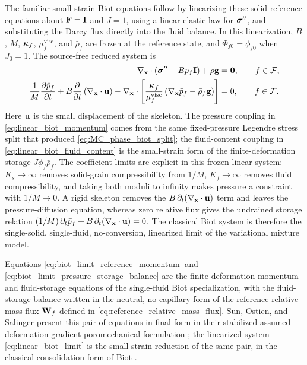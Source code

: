 %
The familiar small-strain Biot equations follow by linearizing these
solid-reference equations about \(\mathbf{F}=\mathbf{I}\) and \(J=1\), using a linear
elastic law for \(\boldsymbol{\sigma}^{\prime\prime}\), and substituting the Darcy flux
directly into the fluid balance.  In this linearization,
\(B\), \(M\), \(\boldsymbol{\kappa}_f\), \(\mu_f^{\mathrm{visc}}\), and \(\bar\rho_f\) are frozen at
the reference state, and \(\Phi_{f0}=\phi_{f0}\) when \(J_0=1\).  The
source-free reduced system is
%
\begin{subequations}
	\label{eq:linear_biot_limit}
	\begin{align}
		\nabla_{\mathbf{x}}\cdot
		\left(
		\boldsymbol{\sigma}^{\prime\prime}
		-B\bar p_f\mathbf{I}
		\right)
		+\rho\mathbf{g}
		 & =\mathbf{0},
		\qquad
		f\in\mathcal{F},
		\label{eq:linear_biot_momentum} \\
		\frac{1}{M}\frac{\partial \bar p_f}{\partial t}
		+B\frac{\partial}{\partial t}
		\left(\nabla_{\mathbf{x}}\cdot\mathbf{u}\right)
		-\nabla_{\mathbf{x}}\cdot
		\left[
			\frac{\boldsymbol{\kappa}_f}{\mu_f^{\mathrm{visc}}}
			\left(\nabla_{\mathbf{x}}\bar p_f-\bar\rho_f\mathbf{g}\right)
			\right]
		 & =0,
		\qquad
		f\in\mathcal{F} .
		\label{eq:linear_biot_fluid_content}
	\end{align}
\end{subequations}
%
Here \(\mathbf{u}\) is the small displacement of the skeleton.  The pressure
coupling in \eqref{eq:linear_biot_momentum} comes from the same fixed-pressure
Legendre stress split that produced \eqref{eq:MC_phase_biot_split}; the
fluid-content coupling in \eqref{eq:linear_biot_fluid_content} is the
small-strain form of the finite-deformation storage \(J\phi_f\bar\rho_f\).
The coefficient limits are explicit in this frozen linear system:
\(K_s\to\infty\) removes solid-grain compressibility from \(1/M\),
\(K_f\to\infty\) removes fluid compressibility, and taking both moduli to
infinity makes pressure a constraint with \(1/M\to0\).  A rigid skeleton
removes the \(B\,\partial_t(\nabla_{\mathbf{x}}\cdot\mathbf{u})\) term and leaves the
pressure-diffusion equation, whereas zero relative flux gives the undrained
storage relation
\((1/M)\,\partial_t\bar p_f+
B\,\partial_t(\nabla_{\mathbf{x}}\cdot\mathbf{u})=0\).
The classical Biot system is therefore the single-solid, single-fluid,
no-conversion, linearized limit of the variational mixture model.

Equations \eqref{eq:biot_limit_reference_momentum} and
\eqref{eq:biot_limit_pressure_storage_balance} are the finite-deformation
momentum and fluid-storage equations of the single-fluid Biot specialization,
with the fluid-storage balance written in the neutral, no-capillary form of
the reference relative mass flux \(\mathbf{W}_f\) defined in
\eqref{eq:reference_relative_mass_flux}.  Sun, Ostien, and Salinger present
this pair of equations in final form in their stabilized
assumed-deformation-gradient poromechanical formulation
\cite{sun2013stabilized}; the linearized system
\eqref{eq:linear_biot_limit} is the small-strain reduction of the same pair,
in the classical consolidation form of Biot
\cite{biot1941general,biotwillis1957}.
